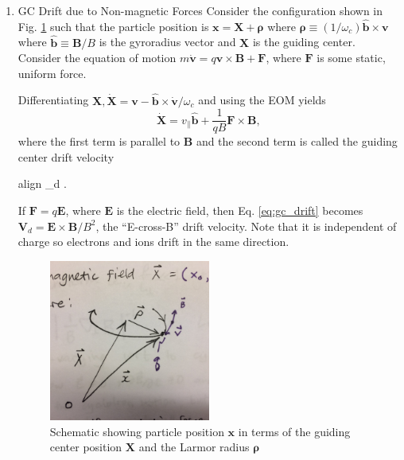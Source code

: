 	\begin{enumerate}

		\item{GC Drift due to Non-magnetic Forces} 
		Consider the configuration shown in Fig. \ref{fig:gyroradius} such that the particle position is $\mathbf{x}=\mathbf{X}+\mathbf{\rho}$ where $\mathbf{\rho}\equiv(1/\omega_c)\hat{\mathbf{b}}\times\mathbf{v}$ where $\hat{\mathbf{b}}\equiv\mathbf{B}/B$ is the gyroradius vector and $\mathbf{X}$ is the guiding center. Consider the equation of motion $m\dot{\mathbf{v}} = q\mathbf{v}\times\mathbf{B}+\mathbf{F}$, where $\mathbf{F}$ is some static, uniform force.

		Differentiating $\mathbf{X},\dot{\mathbf{X}}=\mathbf{v} - \hat{\mathbf{b}}\times\dot{\mathbf{v}}/\omega_c$ and using the EOM yields 
		\begin{equation}
			\dot{\mathbf{X}}= v_{\parallel}\hat{\mathbf{b}} + \frac{1}{qB}\mathbf{F}\times\mathbf{B},
		\end{equation}
		where the first term is parallel to $\mathbf{B}$ and the second term is called the guiding center drift velocity
		\begin{empheq}[box=\widefbox]{align}
			\label{eq:gc_drift}
			_d \equiv {}\times{}.
		\end{empheq}
		If $\mathbf{F} = q\mathbf{E}$, where $\mathbf{E}$ is the electric field, then Eq. \ref{eq:gc_drift} becomes $\mathbf{V}_d = \mathbf{E}\times\mathbf{B}/B^2$, the ``E-cross-B'' drift velocity. Note that it is independent of charge so electrons and ions drift in the same direction.
		\begin{figure}
			\centering
			\includegraphics[width=0.5\textwidth]{figures/gyroradius_schematic.jpeg}
			\caption{Schematic showing particle position $\mathbf{x}$ in terms of the guiding center position $\mathbf{X}$ and the Larmor radius $\mathbf{\rho}$}
			\label{fig:gyroradius}
		\end{figure}


\end{enumerate}
